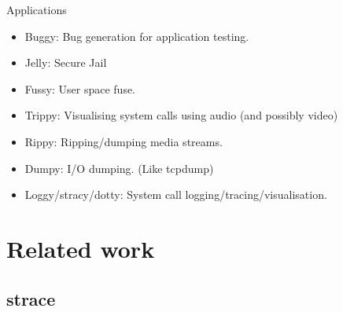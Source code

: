 \documentclass[a4paper, twoside, 10pt, twocolumn]{report}
\begin{document}
Applications
\begin{itemize}
    \item Buggy: Bug generation for application testing.
    \item Jelly: Secure Jail
    \item Fussy: User space fuse.
    \item Trippy: Visualising system calls using audio (and possibly video)
    \item Rippy: Ripping/dumping media streams.
    \item Dumpy: I/O dumping. (Like tcpdump)
    \item Loggy/stracy/dotty: System call logging/tracing/visualisation.
\end{itemize}


\chapter{Related work}

\section{strace}

\end{document}
